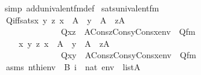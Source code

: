 \begin{isabellebody}
%
\isadelimproof
\ \ %
\endisadelimproof
%
\isatagproof
{}\isamarkupfalse%
\ {\isacharparenleft}{\kern0pt}simp\ add{\isacharcolon}{\kern0pt}univalent{\isacharunderscore}{\kern0pt}fm{\isacharunderscore}{\kern0pt}def{\isacharparenright}{\kern0pt}%
\endisatagproof
{\isafoldproof}%
%
\isadelimproof
\isanewline
%
\endisadelimproof
\isanewline
{}\isamarkupfalse%
\ sats{\isacharunderscore}{\kern0pt}univalent{\isacharunderscore}{\kern0pt}fm\ {\isacharcolon}{\kern0pt}\isanewline
\ \ \isanewline
\ \ \ \ Q{\isacharunderscore}{\kern0pt}iff{\isacharunderscore}{\kern0pt}sats{\isacharcolon}{\kern0pt}{\isachardoublequoteopen}{\isasymAnd}x\ y\ z{\isachardot}{\kern0pt}\ x\ {\isasymin}\ A\ {\isasymLongrightarrow}\ y\ {\isasymin}\ A\ {\isasymLongrightarrow}\ z{\isasymin}A\ {\isasymLongrightarrow}\ \isanewline
\ \ \ \ \ \ \ \ \ \ \ \ \ \ \ \ \ Q{\isacharparenleft}{\kern0pt}x{\isacharcomma}{\kern0pt}z{\isacharparenright}{\kern0pt}\ {\isasymlongleftrightarrow}\ {\isacharparenleft}{\kern0pt}A{\isacharcomma}{\kern0pt}Cons{\isacharparenleft}{\kern0pt}z{\isacharcomma}{\kern0pt}Cons{\isacharparenleft}{\kern0pt}y{\isacharcomma}{\kern0pt}Cons{\isacharparenleft}{\kern0pt}x{\isacharcomma}{\kern0pt}env{\isacharparenright}{\kern0pt}{\isacharparenright}{\kern0pt}{\isacharparenright}{\kern0pt}\ {\isasymTurnstile}\ Q{}{\isacharunderscore}{\kern0pt}fm{\isacharparenright}{\kern0pt}{\isachardoublequoteclose}\isanewline
\ \ \ \ \ \ \ {\isachardoublequoteopen}{\isasymAnd}x\ y\ z{\isachardot}{\kern0pt}\ x\ {\isasymin}\ A\ {\isasymLongrightarrow}\ y\ {\isasymin}\ A\ {\isasymLongrightarrow}\ z{\isasymin}A\ {\isasymLongrightarrow}\ \isanewline
\ \ \ \ \ \ \ \ \ \ \ \ \ \ \ \ \ Q{\isacharparenleft}{\kern0pt}x{\isacharcomma}{\kern0pt}y{\isacharparenright}{\kern0pt}\ {\isasymlongleftrightarrow}\ {\isacharparenleft}{\kern0pt}A{\isacharcomma}{\kern0pt}Cons{\isacharparenleft}{\kern0pt}z{\isacharcomma}{\kern0pt}Cons{\isacharparenleft}{\kern0pt}y{\isacharcomma}{\kern0pt}Cons{\isacharparenleft}{\kern0pt}x{\isacharcomma}{\kern0pt}env{\isacharparenright}{\kern0pt}{\isacharparenright}{\kern0pt}{\isacharparenright}{\kern0pt}\ {\isasymTurnstile}\ Q{}{\isacharunderscore}{\kern0pt}fm{\isacharparenright}{\kern0pt}{\isachardoublequoteclose}\isanewline
\ \ \ \ \ \isanewline
\ \ \ \ asms{\isacharcolon}{\kern0pt}\ {\isachardoublequoteopen}nth{\isacharparenleft}{\kern0pt}i{\isacharcomma}{\kern0pt}env{\isacharparenright}{\kern0pt}\ {\isacharequal}{\kern0pt}\ B{\isachardoublequoteclose}\ {\isachardoublequoteopen}i\ {\isasymin}\ nat{\isachardoublequoteclose}\ {\isachardoublequoteopen}env\ {\isasymin}\ list{\isacharparenleft}{\kern0pt}A{\isacharparenright}{\kern0pt}{\isachardoublequoteclose}\isanewline

\end{isabellebody}

